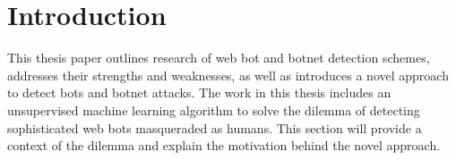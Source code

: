 ﻿
\chapter{Introduction}\label{ch:introduction}
This thesis paper outlines research of web bot and botnet detection schemes, addresses their strengths and weaknesses, as well as introduces a novel approach to detect bots and botnet attacks.
The work in this thesis includes an unsupervised machine learning algorithm to solve the dilemma of detecting sophisticated web bots masqueraded as humans. This section will provide a context of the dilemma and explain the motivation behind the novel approach. %







